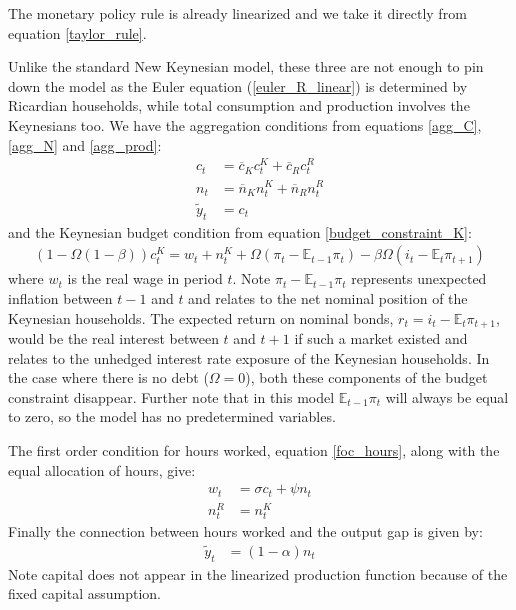 \documentclass[titlepage]{\econtex}\newcommand{\texname}{ConsumptionHeterogeneity}
\begin{document}
The monetary policy rule is already linearized and we take it directly from equation \ref{taylor_rule}.

Unlike the standard New Keynesian model, these three are not enough to pin down the model as the Euler equation (\ref{euler_R_linear}) is determined by Ricardian households, while total consumption and production involves the Keynesians too. We have the aggregation conditions from equations \ref{agg_C}, \ref{agg_N} and \ref{agg_prod}:
\begin{align}
c_t &= \overline{c}_{K} c^K_t + \overline{c}_{R} c^R_t \label{agg_C_linear} \\
n_t &= \overline{n}_{K} n^K_t + \overline{n}_{R} n^R_t \label{agg_N_linear} \\
\tilde{y}_t &= c_t \label{agg_prod_linear}
\end{align}
and the Keynesian budget condition from equation \ref{budget_constraint_K}:
\begin{align}
(1-\Omega (1-\beta)) c^K_t = w_t + n^K_t + \Omega \left(\pi_t - \mathbb{E}_{t-1}\pi_t\right) - \beta \Omega  (i_t - \mathbb{E}_t \pi_{t+1})  \label{budget_constraint_K_linear}
\end{align}
where $w_t$ is the real wage in period $t$. Note $\pi_t - \mathbb{E}_{t-1}\pi_t$ represents unexpected inflation between $t-1$ and $t$ and relates to the net nominal position of the Keynesian households. The expected return on nominal bonds, $r_t = i_t - \mathbb{E}_t \pi_{t+1}$, would be the real interest between $t$ and $t+1$ if such a market existed and relates to the unhedged interest rate exposure of the Keynesian households. In the case where there is no debt ($\Omega=0$), both these components of the budget constraint disappear. Further note that in this model $\mathbb{E}_{t-1}\pi_t$ will always be equal to zero, so the model has no predetermined variables.

The first order condition for hours worked, equation \ref{foc_hours}, along with the equal allocation of hours, give:
\begin{align}
w_t &= \sigma c_t + \psi n_t \label{foc_hours_linear} \\
n^R_t &= n^K_t
\end{align}
Finally the connection between hours worked and the output gap is given by:
\begin{align}
\tilde{y}_t &= (1-\alpha)n_t  \label{production_linear}
\end{align}
Note capital does not appear in the linearized production function because of the fixed capital assumption.
\end{document}
